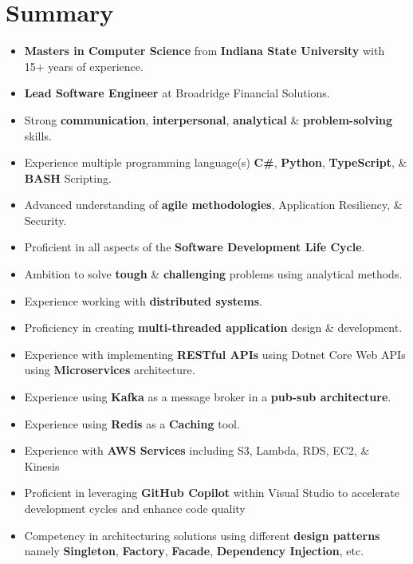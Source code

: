 \documentclass[letterpaper,9pt]{article}
\begin{document}
\section{Summary}
\begin{itemize}[itemsep=0.5em]
	\item \textbf{Masters in Computer Science} from \textbf{Indiana State University} with 15+ years of experience.
    \item \textbf{\color{black}Lead Software Engineer} at Broadridge Financial Solutions.
    \item Strong \textbf{\color{black}communication}, \textbf{\color{black}interpersonal}, \textbf{\color{black}analytical} \& \textbf{\color{black}problem-solving} skills.
    \item Experience multiple programming language(s) \textbf{\color{black}C\#}, \textbf{\color{black}Python}, \textbf{\color{black}TypeScript}, \& \textbf{\color{black}BASH} Scripting.
    \item Advanced understanding of \textbf{\color{black}agile methodologies}, Application Resiliency, \& Security.
    \item Proficient in all aspects of the \textbf{\color{black}Software Development Life Cycle}.
    \item Ambition to solve \textbf{\color{black}tough} \& \textbf{\color{black}challenging} problems using analytical methods.
    \item Experience working with \textbf{\color{black}distributed systems}.
    \item Proficiency in creating \textbf{\color{black}multi-threaded application} design \& development.
    \item Experience with implementing \textbf{\color{black}RESTful APIs} using Dotnet Core Web APIs using \textbf{\color{black}Microservices} architecture.
    \item Experience using \textbf{\color{black}Kafka} as a message broker in a \textbf{\color{black}pub-sub architecture}.
    \item Experience using \textbf{\color{black}Redis} as a \textbf{\color{black}Caching} tool.
    \item Experience with \textbf{\color{black}AWS Services} including S3, Lambda, RDS, EC2, \& Kinesis
    \item Proficient in leveraging \textbf{\color{black}GitHub Copilot} within Visual Studio to accelerate development cycles and enhance code quality
    \item Competency in architecturing solutions using different \textbf{\color{black}design patterns} namely \textbf{\color{black}Singleton}, \textbf{\color{black}Factory}, \textbf{\color{black}Facade}, \textbf{\color{black}Dependency Injection}, etc.

\end{itemize}
\end{document}
